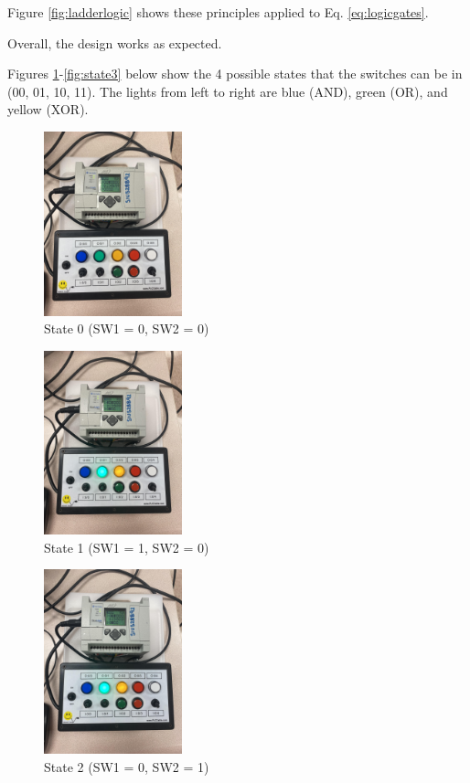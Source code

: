 \documentclass{IEEEtran}
\begin{document}
Figure \ref{fig:ladderlogic} shows these principles applied to Eq. \ref{eq:logicgates}.

Overall, the design works as expected. 

Figures \ref{fig:state0}-\ref{fig:state3} below show the 4 possible states that the switches can be in (00, 01, 10, 11). The lights from left to right are blue (AND), green (OR), and yellow (XOR).

\begin{figure}[!ht] 
    \centering
    \includegraphics[width = 4cm]{state0.jpg}
    \caption{State 0 (SW1 = 0, SW2 = 0)}
    \label{fig:state0}
\end{figure}

\begin{figure}[!ht] 
    \centering
    \includegraphics[width = 4cm]{state1.jpg}
    \caption{State 1 (SW1 = 1, SW2 = 0)}
    \label{fig:state1}
\end{figure}

\begin{figure}[!ht] 
    \centering
    \includegraphics[width = 4cm]{state2.jpg}
    \caption{State 2 (SW1 = 0, SW2 = 1)}
    \label{fig:state2}
\end{figure}
\end{document}
